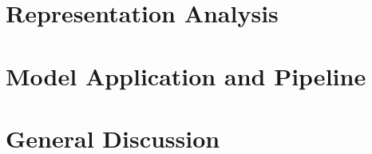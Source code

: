 \documentclass{yorkThesis}
\begin{document}
\chapter{Representation Analysis}
\label{chapter_repr_anal}


\chapter{Model Application and Pipeline}
\label{chapter_appliction}


\chapter{General Discussion}
\label{chapter_general_discussion}




\end{document}
